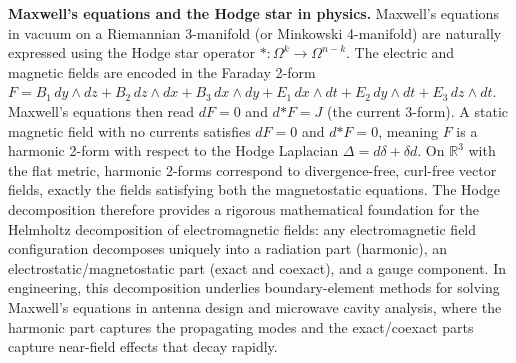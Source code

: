\noindent\textbf{Maxwell's equations and the Hodge star in physics.} Maxwell's equations in vacuum on a Riemannian 3-manifold (or Minkowski 4-manifold) are naturally expressed using the Hodge star operator $*\colon\Omega^k\to\Omega^{n-k}$. The electric and magnetic fields are encoded in the Faraday 2-form $F=B_1\,dy\wedge dz+B_2\,dz\wedge dx+B_3\,dx\wedge dy+E_1\,dx\wedge dt+E_2\,dy\wedge dt+E_3\,dz\wedge dt$. Maxwell's equations then read $dF=0$ and $d{*F}=J$ (the current 3-form). A static magnetic field with no currents satisfies $dF=0$ and $d{*F}=0$, meaning $F$ is a harmonic 2-form with respect to the Hodge Laplacian $\Delta=d\delta+\delta d$. On $\mathbb R^3$ with the flat metric, harmonic 2-forms correspond to divergence-free, curl-free vector fields, exactly the fields satisfying both the magnetostatic equations. The Hodge decomposition therefore provides a rigorous mathematical foundation for the Helmholtz decomposition of electromagnetic fields: any electromagnetic field configuration decomposes uniquely into a radiation part (harmonic), an electrostatic/magnetostatic part (exact and coexact), and a gauge component. In engineering, this decomposition underlies boundary-element methods for solving Maxwell's equations in antenna design and microwave cavity analysis, where the harmonic part captures the propagating modes and the exact/coexact parts capture near-field effects that decay rapidly.
